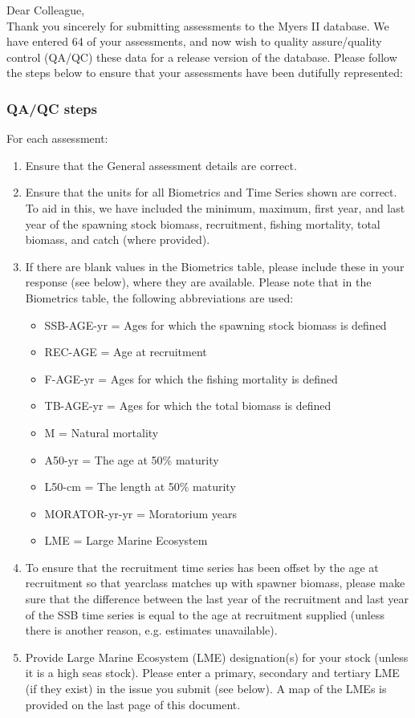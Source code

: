 \documentclass [a4paper, 10pt] {article}
\begin{document}
\noindent Dear Colleague,\\

\noindent Thank you sincerely for submitting assessments to the Myers II database. We have entered 64 of your assessments, and now wish to quality assure/quality control (QA/QC) these data for a release version of the database. Please follow the steps below to ensure that your assessments have been dutifully represented:
\subsubsection{QA/QC steps}
For each assessment:
\begin{enumerate}
\item Ensure that the General assessment details are correct.
\item Ensure that the units for all Biometrics and Time Series shown are correct. To aid in this, we have included the minimum, maximum, first year, and last year of the spawning stock biomass, recruitment, fishing mortality, total biomass, and  catch  (where provided). 
\item If there are blank values in the Biometrics table, please include these in your response (see below), where they are available.
Please note that in the Biometrics table, the following abbreviations are used:
\begin{itemize}
\item SSB-AGE-yr  = Ages for which the spawning stock biomass is defined
\item REC-AGE     = Age at recruitment
\item F-AGE-yr    = Ages for which the fishing mortality is defined 
\item TB-AGE-yr   = Ages for which the total biomass is defined
\item M      = Natural mortality
\item A50-yr      = The age at 50\% maturity
\item L50-cm      = The length at 50\% maturity
\item MORATOR-yr-yr = Moratorium years
\item LME = Large Marine Ecosystem\\
\end{itemize}
\item To ensure that the recruitment time series has been offset by the age at recruitment so that yearclass matches up with spawner biomass, please make sure that the difference between the last year of the recruitment and last year of the SSB time series is equal to the age at recruitment supplied (unless there is another reason, e.g. estimates unavailable). 
\item Provide Large Marine Ecosystem (LME) designation(s) for your stock (unless it is a high seas stock). Please enter a primary, secondary and tertiary LME (if they exist) in the issue you submit (see below). A map of the LMEs is provided on the last page of this document. 
\end{enumerate}
\vspace{-.25in}
\end{document}
